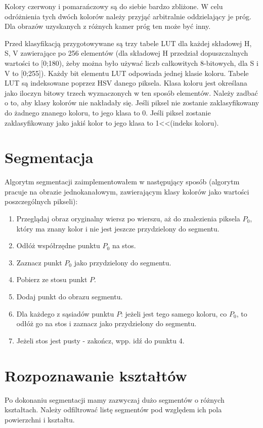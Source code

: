 \documentclass[12pt,a4paper]{article}
\begin{document}
Kolory czerwony i pomarańczowy są do siebie bardzo zbliżone. W celu odróżnienia tych dwóch kolorów należy przyjąć arbitralnie oddzielający je próg. Dla obrazów uzyskanych z różnych kamer próg ten może być inny.

Przed klasyfikacją przygotowywane są trzy tabele LUT dla każdej składowej H, S, V zawierające po 256 elementów (dla składowej H przedział dopuszczalnych wartości to [0;180), żeby można było używać liczb całkowitych 8-bitowych, dla S i V to [0;255]). Każdy bit elementu LUT odpowiada jednej klasie koloru. Tabele LUT są indeksowane poprzez HSV danego piksela. Klasa koloru jest określana jako iloczyn bitowy trzech wyznaczonych w ten sposób elementów. Należy zadbać o to, aby klasy kolorów nie nakładały się.
Jeśli piksel nie zostanie zaklasyfikowany do żadnego znanego koloru, to jego klasa to 0. Jeśli piksel zostanie zaklasyfikowany jako jakiś kolor to jego klasa to 1<<(indeks koloru).

\section{Segmentacja}

Algorytm segmentacji zaimplementowałem w następujący sposób (algorytm pracuje na obrazie jednokanałowym, zawierającym klasy kolorów jako wartości poszczególnych pikseli):
\begin{enumerate}
	\item Przeglądaj obraz oryginalny wiersz po wierszu, aż do znalezienia piksela $P_0$, który ma znany kolor i nie jest jeszcze przydzielony do segmentu.
	\item Odłóż współrzędne punktu $P_0$ na stos. 
	\item Zaznacz punkt $P_0$ jako przydzielony do segmentu.
	\item Pobierz ze stosu punkt $P$.
	\item Dodaj punkt do obrazu segmentu.
	\item Dla każdego z sąsiadów punktu $P$: jeżeli jest tego samego koloru, co $P_0$, to odłóż go na stos i zaznacz jako przydzielony do segmentu.
	\item Jeżeli stos jest pusty - zakończ, wpp. idź do punktu 4.
\end{enumerate}

\section{Rozpoznawanie kształtów}

Po dokonaniu segmentacji mamy zazwyczaj dużo segmentów o różnych kształtach. Należy odfiltrować listę segmentów pod względem ich pola powierzchni i kształtu.
\end{document}
